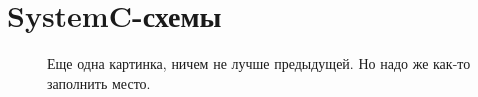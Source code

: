 \chapter{SystemC-схемы}
\label{cha:appendix2}

{
\begin{figure}
\centering
\caption{Еще одна картинка, ничем не лучше предыдущей. Но надо же как-то заполнить место.}
\end{figure}
}

